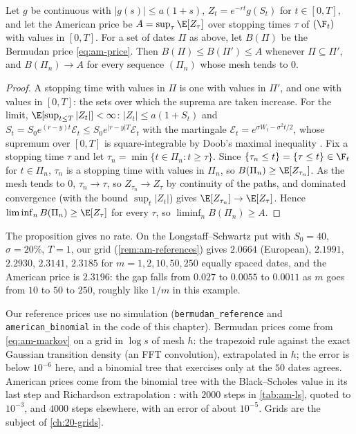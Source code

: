 \begin{proposition}\label{prop:am-american}
Let $g$ be continuous with $|g(s)|\le a(1+s)$, $Z_t=e^{-rt}g(S_t)$ for $t\in[0,T]$, and
let the American price be $A=\sup_\tau\E[Z_\tau]$ over stopping times $\tau$ of $(\F_t)$
with values in $[0,T]$. For a set of dates $\Pi$ as above, let $B(\Pi)$ be the Bermudan price
\eqref{eq:am-price}. Then $B(\Pi)\le B(\Pi')\le A$ whenever $\Pi\subseteq\Pi'$, and
$B(\Pi_n)\to A$ for every sequence $(\Pi_n)$ whose mesh tends to $0$.
\end{proposition}

\begin{proof}
A stopping time with values in $\Pi$ is one with values in $\Pi'$, and one with values in
$[0,T]$: the sets over which the suprema are taken increase. For the limit, $\E[\sup_{t\le
T}|Z_t|]<\infty$: $|Z_t|\le a(1+S_t)$ and $S_t=S_0e^{(r-y)t}\mathcal E_t\le S_0e^{|r-y|T}\mathcal E_t$
with the martingale $\mathcal E_t=e^{\sigma W_t-\sigma^2t/2}$, whose supremum over $[0,T]$ is
square-integrable by Doob's maximal inequality \citep[Theorem~1.3.8]{karatzas-shreve}. Fix a stopping
time $\tau$ and let $\tau_n=\min\{t\in\Pi_n:t\ge\tau\}$. Since
$\{\tau_n\le t\}=\{\tau\le t\}\in\F_t$ for $t\in\Pi_n$, $\tau_n$ is a stopping time with
values in $\Pi_n$, so $B(\Pi_n)\ge\E[Z_{\tau_n}]$. As the mesh tends to $0$, $\tau_n\to\tau$,
so $Z_{\tau_n}\to Z_\tau$ by continuity of the paths, and dominated convergence (with the
bound $\sup_t|Z_t|$) gives $\E[Z_{\tau_n}]\to\E[Z_\tau]$. Hence $\liminf_nB(\Pi_n)\ge\E[Z_\tau]$
for every $\tau$, so $\liminf_nB(\Pi_n)\ge A$.
\end{proof}

The proposition gives no rate. On the Longstaff--Schwartz put with $S_0=40$, $\sigma=20\%$,
$T=1$, our grid (\cref{rem:am-references}) gives $2.0664$ (European), $2.1991$, $2.2930$,
$2.3141$, $2.3185$ for $m=1,2,10,50,250$ equally spaced dates, and the American price is
$2.3196$: the gap falls from $0.027$ to $0.0055$ to $0.0011$ as $m$ goes from $10$ to $50$
to $250$, roughly like $1/m$ in this example.

\begin{remark}\label{rem:am-references}
Our reference prices use no simulation (\texttt{bermudan\_reference} and
\texttt{american\_binomial} in the code of this chapter). Bermudan prices come from \eqref{eq:am-markov} on a grid in $\log s$ of mesh $h$: the trapezoid rule
against the exact Gaussian transition density (an FFT convolution), extrapolated in $h$; the
error is below $10^{-6}$ here, and a binomial tree that exercises only at the $50$ dates
agrees. American prices come from the binomial tree with the Black--Scholes value in its last
step and Richardson extrapolation \citep{broadie-detemple}: with $2000$ steps in
\cref{tab:am-ls}, quoted to $10^{-3}$, and $4000$ steps elsewhere, with an error of about
$10^{-5}$. Grids are the subject of \cref{ch:20-grids}.
\end{remark}

